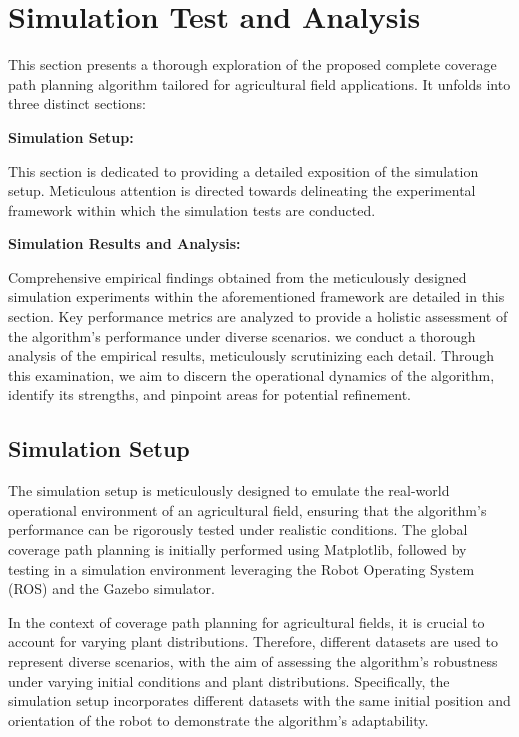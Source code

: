 
\section{Simulation Test and Analysis}

This section presents a thorough exploration of the proposed complete coverage path planning algorithm tailored for agricultural field applications. It unfolds into three distinct sections:

\vspace*{6mm}  

\textbf{Simulation Setup:} 

This section is dedicated to providing a detailed exposition of the simulation setup. Meticulous attention is directed towards delineating the experimental framework within which the simulation tests are conducted.

\vspace*{6mm}  

\textbf{Simulation Results and Analysis:}

Comprehensive empirical findings obtained from the meticulously designed simulation experiments within the aforementioned framework are detailed in this section. Key performance metrics are analyzed to provide a holistic assessment of the algorithm's performance under diverse scenarios. we conduct a thorough analysis of the empirical results, meticulously scrutinizing each detail. Through this examination, we aim to discern the operational dynamics of the algorithm, identify its strengths, and pinpoint areas for potential refinement.
\vspace*{6mm}  

\subsection{Simulation Setup}


The simulation setup is meticulously designed to emulate the real-world operational environment of an agricultural field, ensuring that the algorithm's performance can be rigorously tested under realistic conditions. The global coverage path planning is initially performed using Matplotlib, followed by testing in a simulation environment leveraging the Robot Operating System (ROS) and the Gazebo simulator.

\vspace*{6mm}  

In the context of coverage path planning for agricultural fields, it is crucial to account for varying plant distributions. Therefore, different datasets are used to represent diverse scenarios, with the aim of assessing the algorithm's robustness under varying initial conditions and plant distributions. Specifically, the simulation setup incorporates different datasets with the same initial position and orientation of the robot to demonstrate the algorithm's adaptability.

